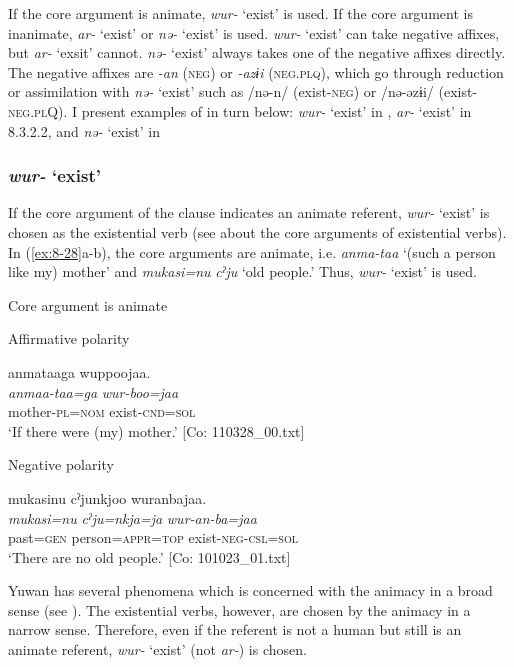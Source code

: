 If the core argument is animate, \textit{wur-} ‘exist’ is used. If the core argument is inanimate, \textit{ar-} ‘exist’ or \textit{nə-} ‘exist’ is used. \textit{wur-} ‘exist’ can take negative affixes, but \textit{ar-} ‘exsit’ cannot. \textit{nə-} ‘exist’ always takes one of the negative affixes directly. The negative affixes are \textit{-an} (\textsc{neg}) or \textit{-azɨi} (\textsc{neg}.\textsc{plq}), which go through reduction or assimilation with \textit{nə-} ‘exist’ such as /nə-n/ (exist-\textsc{neg}) or /nə-əzɨi/ (exist-\textsc{neg}.\textsc{pl}Q). I present examples of  in turn below: \textit{wur-} ‘exist’ in , \textit{ar-} ‘exist’ in 8.3.2.2, and \textit{nə-} ‘exist’ in 

\subsubsection{\textit{wur-} ‘exist’}

If the core argument of the clause indicates an animate referent, \textit{wur-} ‘exist’ is chosen as the existential verb (see  about the core arguments of existential verbs). In (\ref{ex:8-28}a-b), the core arguments are animate, i.e. \textit{anma-taa} ‘(such a person like my) mother’ and \textit{mukasi=nu} \textit{cˀju} ‘old people.’ Thus, \textit{wur-} ‘exist’ is used.

\ea\label{ex:8-28}  Core argument is animate

\ea Affirmative polarity

{\TM}
\glll  anmataaga  wuppoojaa.\\
\textit{anmaa-taa=ga}  \textit{wur-boo=jaa}\\
mother-\textsc{pl}=\textsc{nom}  exist-\textsc{cnd}=\textsc{sol}\\
\glt ‘If there were (my) mother.’ [Co: 110328\_00.txt]

\ex Negative polarity

{\TM}
\glll  mukasinu  cˀjunkjoo  wuranbajaa.\\
\textit{mukasi=nu}  \textit{cˀju=nkja=ja}  \textit{wur-an-ba=jaa}\\
past=\textsc{gen}  person=\textsc{appr}=\textsc{top}  exist-\textsc{neg}-\textsc{csl}=\textsc{sol}\\
\glt ‘There are no old people.’ [Co: 101023\_01.txt]
\z
\z

Yuwan has several phenomena which is concerned with the animacy in a broad sense (see ). The existential verbs, however, are chosen by the animacy in a narrow sense. Therefore, even if the referent is not a human but still is an animate referent, \textit{wur-} ‘exist’ (not \textit{ar-}) is chosen.

